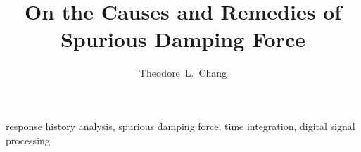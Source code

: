 \documentclass[3p,sort&compress,11pt,fleqn,review]{elsarticle}
\begin{document}
\begin{abstract}
\end{abstract}
\begin{keyword}
response history analysis\sep
spurious damping force\sep
time integration\sep
digital signal processing
\end{keyword}
\begin{frontmatter}
\title{On the Causes and Remedies of Spurious Damping Force}
\author[add1]{Theodore~L.~Chang}
\address[add1]{IRIS Adlershof, Humboldt-Universität zu Berlin, Berlin, Germany, 12489.}
\end{frontmatter}



\end{document}

